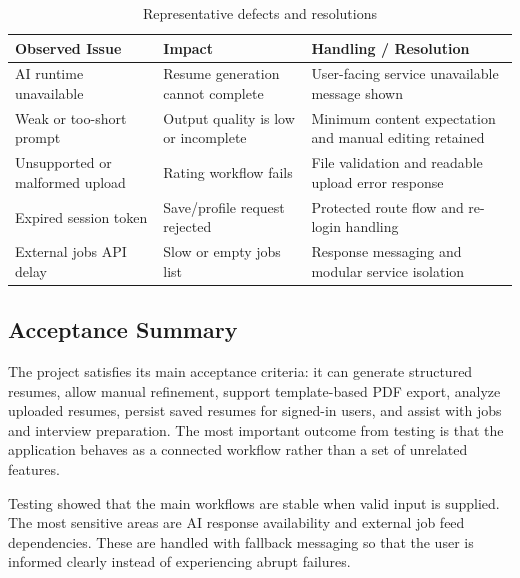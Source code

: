 \begin{table}[H]
\centering
\caption{Representative defects and resolutions}
\begin{tabular}{|p{3.8cm}|p{4.5cm}|p{3.9cm}|}
\hline
\textbf{Observed Issue} & \textbf{Impact} & \textbf{Handling / Resolution} \\
\hline
AI runtime unavailable & Resume generation cannot complete & User-facing service unavailable message shown \\
\hline
Weak or too-short prompt & Output quality is low or incomplete & Minimum content expectation and manual editing retained \\
\hline
Unsupported or malformed upload & Rating workflow fails & File validation and readable upload error response \\
\hline
Expired session token & Save/profile request rejected & Protected route flow and re-login handling \\
\hline
External jobs API delay & Slow or empty jobs list & Response messaging and modular service isolation \\
\hline
\end{tabular}
\end{table}

\subsection{Acceptance Summary}
\noindent The project satisfies its main acceptance criteria: it can generate structured resumes, allow manual refinement, support template-based PDF export, analyze uploaded resumes, persist saved resumes for signed-in users, and assist with jobs and interview preparation. The most important outcome from testing is that the application behaves as a connected workflow rather than a set of unrelated features.

\noindent Testing showed that the main workflows are stable when valid input is supplied. The most sensitive areas are AI response availability and external job feed dependencies. These are handled with fallback messaging so that the user is informed clearly instead of experiencing abrupt failures.
